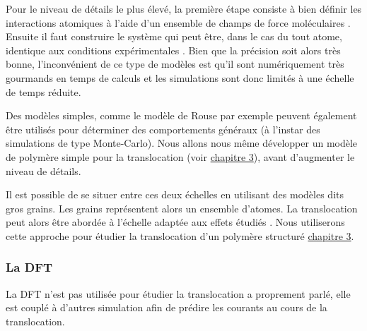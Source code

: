 Pour le niveau de détails le plus élevé, la première étape consiste à bien définir les interactions atomiques à l'aide d'un ensemble de champs de force moléculaires \cite{allen1987computer}. Ensuite il faut construire le système qui peut être, dans le cas du tout atome, identique aux conditions expérimentales \cite{Sathe2011,Farimani2014,Meunier2008,Chen2012,Kim2013,Postma2010,Jeong2013,Saha2012,Min2011,Aksimentiev2005,Aksimentiev2009,Heng2004,Heng2006}.
Bien que la précision soit alors très bonne, l'inconvénient de ce type de modèles est qu'il sont numériquement très gourmands en temps de calculs et les simulations sont donc limités à une échelle de temps réduite.

Des modèles simples, comme le modèle de Rouse par exemple peuvent également être utilisés pour déterminer des comportements généraux  \cite{Tian2003,Huopaniemi2006,Huopaniemi2007,Luo2008,Bhattacharya2009,Fyta2008,Luo2009,Ikonen2012}
(à l'instar des simulations de type Monte-Carlo). Nous allons nous même développer un modèle de polymère simple pour la translocation (voir \hyperref[porelargesimplepol]{chapitre 3}), avant d'augmenter le niveau de détails.

Il est possible de se situer entre ces deux échelles en utilisant des modèles dits gros grains. Les grains représentent alors un ensemble d'atomes. La translocation peut alors être abordée à l'échelle adaptée aux effets étudiés \cite{Forrey2007,Lansac2004,Ramachandran2011}. Nous utiliserons cette approche pour étudier la translocation d'un polymère structuré \hyperref[porelarge]{chapitre 3}.



\subsubsection*{La DFT}

La DFT n'est pas utilisée pour étudier la translocation a proprement parlé, elle est couplé à d'autres simulation afin de prédire les courants au cours de la translocation.




